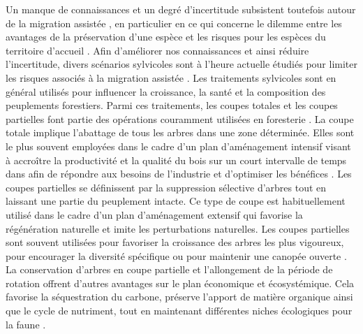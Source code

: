 Un manque de connaissances et un degré d'incertitude subsistent toutefois autour de la migration assistée \citep{Park2018Informationunderload,Klenk2015assistedmigration}, 
en particulier en ce qui concerne le dilemme entre les avantages de la préservation d'une espèce et les risques pour les espèces du territoire d'accueil \citep{Hewitt2011Takingstock,McLachlan2007frameworkdebate,Vitt2010Assistedmigration}.
Afin d'améliorer nos connaissances et ainsi réduire l'incertitude, divers scénarios sylvicoles sont à l'heure actuelle étudiés pour limiter les risques associés à la migration assistée \citep{royoDesiredREgenerationAssisted2023}.
Les traitements sylvicoles sont en général utilisés pour influencer la croissance, la santé et la composition des peuplements forestiers.
Parmi ces traitements, les coupes totales et les coupes partielles font partie des opérations couramment utilisées en foresterie \citep{Ameray2021Forestcarbon,Chaudhary2016Impactforest,Man2008Elevenyearresponses,MontoroGirona2018ConiferRegeneration,PamerleauCouture2015Effectthree}. 
La coupe totale implique l'abattage de tous les arbres dans une zone déterminée.
Elles sont le plus souvent employées dans le cadre d'un plan d'aménagement intensif visant à accroître la productivité et la qualité du bois 
sur un court intervalle de temps dans afin de répondre aux besoins de l'industrie et d'optimiser les bénéfices \citep{Ameray2021Forestcarbon}.
Les coupes partielles se définissent par la suppression sélective d'arbres tout en laissant une partie du peuplement intacte. 
Ce type de coupe est habituellement utilisé dans le cadre d'un plan d'aménagement extensif qui favorise la régénération naturelle et imite les perturbations naturelles.
Les coupes partielles sont souvent utilisées pour favoriser la croissance des arbres les plus vigoureux, pour encourager la diversité spécifique ou pour maintenir une canopée ouverte \citep{Ameray2021Forestcarbon,Irland2011Timberproductivity}.
La conservation d'arbres en coupe partielle et l'allongement de la période de rotation offrent d'autres avantages sur le plan économique et écosystémique. 
Cela favorise la séquestration du carbone, préserve l'apport de matière organique ainsi que le cycle de nutriment, 
tout en maintenant différentes niches écologiques pour la faune \citep{Ameray2021Forestcarbon,Barg1999Influencepartial,Tong2020Forestmanagement}.

